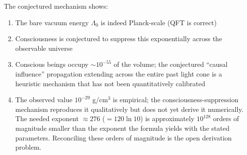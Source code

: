 \begin{remark}
The conjectured mechanism shows:
\begin{enumerate}
\item The bare vacuum energy $\Lambda_0$ is indeed Planck-scale (QFT is correct)
\item Consciousness is conjectured to suppress this exponentially across the observable universe
\item Conscious beings occupy $\sim 10^{-55}$ of the volume; the conjectured ``causal influence'' propagation extending across the entire past light cone is a heuristic mechanism that has not been quantitatively calibrated
\item The observed value $10^{-29}$ g/cm$^3$ is empirical; the consciousness-suppression mechanism reproduces it qualitatively but does not yet derive it numerically. The needed exponent $\approx 276$ ($= 120 \ln 10$) is approximately $10^{128}$ orders of magnitude smaller than the exponent the formula yields with the stated parameters. Reconciling these orders of magnitude is the open derivation problem.
\end{enumerate}
\end{remark}

